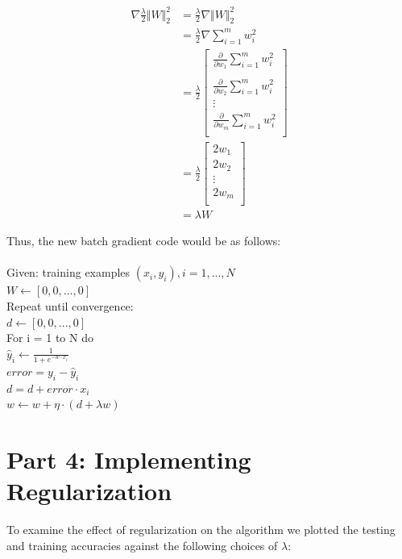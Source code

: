 \documentclass{article}
\newcommand\tab[1][1cm]{\hspace*{#1}}
\begin{document}
	\begin{align}
	\nabla \frac{\lambda}{2} \Vert W \Vert_{2}^{2} &= \frac{\lambda}{2} \nabla \Vert W \Vert_{2}^{2} \\
	 &= \frac{\lambda}{2} \nabla \sum_{i = 1}^{m} w_{i}^{2} \\
	 &= \frac{\lambda}{2} \begin{bmatrix}
		 \frac{\partial}{\partial w_{1}} \sum_{i = 1}^{m} w_{i}^{2} \\ \\
		 \frac{\partial}{\partial w_{2}} \sum_{i = 1}^{m} w_{i}^{2} \\
		 \vdots \\
		 \frac{\partial}{\partial w_{m}} \sum_{i = 1}^{m} w_{i}^{2} \\
		 \end{bmatrix}\\
	&= \frac{\lambda}{2} \begin{bmatrix}
	2 w_{1} \\
	2 w_{2} \\
	\vdots \\
	2 w_{m} \\
	 \end{bmatrix}\\
	&= \lambda W
	\end{align}
	
Thus, the new batch gradient code would be as follows:\\
\\
Given: training examples $(x_{i}, y_{i}), i = 1, ..., N$ \\
$W \leftarrow [0, 0, ..., 0]$ \\
Repeat until convergence: \\
\tab $ d \leftarrow [0, 0, ..., 0]$ \\
\tab For i = 1 to N do \\
\tab \tab $\hat{y}_{i} \leftarrow \frac{1}{1 + e^{-w \cdot x_{i}}}$ \\
\tab \tab $error = y_{i} - \hat{y}_{i}$ \\
\tab \tab $d = d + error \cdot x_{i}$ \\
\tab $w \leftarrow w + \eta \cdot (d + \lambda w)$
		


	
	\section*{Part 4: Implementing Regularization}
	
To examine the effect of regularization on the algorithm we plotted the testing and training accuracies against the following choices of $\lambda$:
\end{document}
